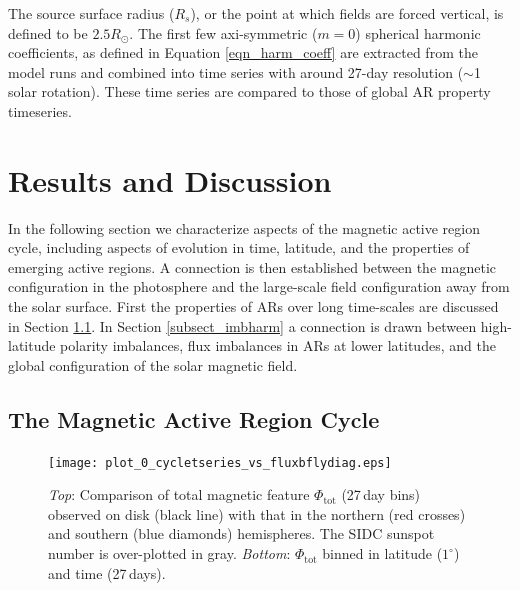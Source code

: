 The source surface radius ($R_{s}$), or the point at which fields are forced vertical, is defined to be $2.5R_{\odot}$. The first few axi-symmetric ($m=0$) spherical harmonic coefficients, as defined in Equation \ref{eqn_harm_coeff} are extracted from the model runs and combined into time series with around 27-day resolution ($\sim$1 solar rotation). These time series are compared to those of global \gls{AR} property timeseries.


\section{Results and Discussion}\label{sect:globresults}

In the following section we characterize aspects of the magnetic active region cycle, including aspects of evolution in time, latitude, and the properties of emerging active regions. A connection is then established between the magnetic configuration in the photosphere and the large-scale field configuration away from the solar surface. First the properties of \glspl{AR} over long time-scales are discussed in Section \ref{subsect_arcycle}. 
In Section \ref{subsect_imbharm} a connection is drawn between high-latitude polarity imbalances, flux imbalances in \glspl{AR} at lower latitudes, and the global configuration of the solar magnetic field.


\subsection{The Magnetic Active Region Cycle}\label{subsect_arcycle}


\begin{figure}[!t]
\centerline{\texttt{[image: plot\_0\_cycletseries\_vs\_fluxbflydiag.eps]}}
\caption[The magnetic flux and sunspot number over cycle 23.]{\emph{Top}: Comparison of total magnetic feature $\Phi_{\mathrm{tot}}$ (27\,day bins) observed on disk (black line) with that in the northern (red crosses) and southern (blue diamonds) hemispheres. The SIDC sunspot number is over-plotted in gray. \emph{Bottom}: $\Phi_{\mathrm{tot}}$ binned in latitude ($1^{\circ}$) and time (27\,days).}
\label{plot_0_cycletseries_vs_fluxbflydiag}
\end{figure}


